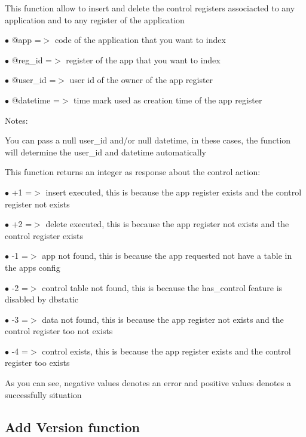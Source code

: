 \documentclass[a4paper]{book}
\begin{document}
This function allow to insert and delete the control registers associacted
to any application and to any register of the application

\begin{compactitem}
\item[\color{myblue}$\bullet$] @app      =$>$ code of the application that you want to index
\item[\color{myblue}$\bullet$] @reg\_id   =$>$ register of the app that you want to index
\item[\color{myblue}$\bullet$] @user\_id  =$>$ user id of the owner of the app register
\item[\color{myblue}$\bullet$] @datetime =$>$ time mark used as creation time of the app register
\end{compactitem}

Notes:

You can pass a null user\_id and/or null datetime, in these cases, the
function will determine the user\_id and datetime automatically

This function returns an integer as response about the control action:

\begin{compactitem}
\item[\color{myblue}$\bullet$] +1 =$>$ insert executed, this is because the app register exists and the control register not exists
\item[\color{myblue}$\bullet$] +2 =$>$ delete executed, this is because the app register not exists and the control register exists
\item[\color{myblue}$\bullet$] -1 =$>$ app not found, this is because the app requested not have a table in the apps config
\item[\color{myblue}$\bullet$] -2 =$>$ control table not found, this is because the has\_control feature is disabled by dbstatic
\item[\color{myblue}$\bullet$] -3 =$>$ data not found, this is because the app register not exists and the control register too not exists
\item[\color{myblue}$\bullet$] -4 =$>$ control exists, this is because the app register exists and the control register too exists
\end{compactitem}

As you can see, negative values denotes an error and positive values denotes a successfully situation

\hypertarget{toc55}{}
\subsection{Add Version function}
\end{document}
